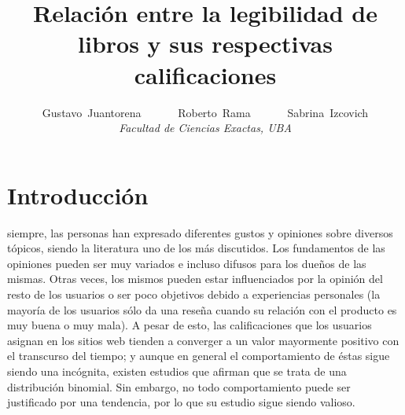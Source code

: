 \documentclass[12pt,journal,compsoc]{IEEEtran}
\begin{document}
\title{Relación entre la legibilidad de libros y sus respectivas calificaciones}

\author{Gustavo~Juantorena~~~~~~
        Roberto~Rama~~~~~~
        Sabrina~Izcovich\\
        \textit{Facultad de Ciencias Exactas, UBA}}



\maketitle
\IEEEdisplaynontitleabstractindextext
\IEEEpeerreviewmaketitle

\section{Introducción}
 siempre, las personas han expresado diferentes gustos y opiniones sobre diversos tópicos, siendo la literatura uno de los más discutidos. Los fundamentos de las opiniones pueden ser muy variados e incluso difusos para los dueños de las mismas. Otras veces, los mismos pueden estar influenciados por la opinión del resto de los usuarios\cite{muchnik} o ser poco objetivos debido a experiencias personales (la mayoría de los usuarios sólo da una reseña cuando su relación con el producto es muy buena o muy mala\cite{hu}). A pesar de esto, las calificaciones que los usuarios asignan en los sitios web tienden a converger a un valor mayormente positivo con el transcurso del tiempo\cite{zhang}; y aunque en general el comportamiento de éstas sigue siendo una incógnita, existen estudios que afirman que se trata de una distribución binomial\cite{hu}. Sin embargo, no todo comportamiento puede ser justificado por una tendencia\cite{zhang}, por lo que su estudio sigue siendo valioso.
\end{document}
